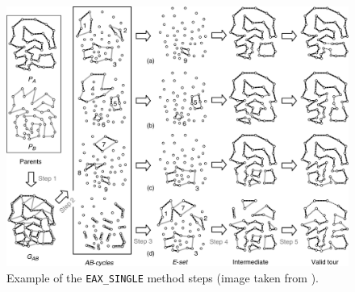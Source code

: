 \begin{figure}[h]
	\centering
	\includegraphics[width=1.0\columnwidth]{img/GA_steps}
	\caption{Example of the \texttt{EAX\_SINGLE} method steps (image taken from \cite{Nagata2013}).}
	\label{fig:GA_steps}
\end{figure}

